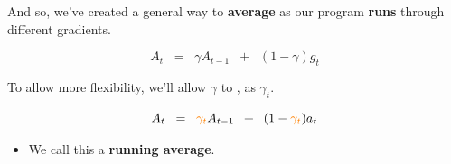             And so, we've created a general way to \textbf{average} as our program \textbf{runs} through different gradients.

            \begin{equation}
                A_t \;\;=\;\; 
                \gamma A_{t-1} \;\;+\;\; 
                (1-\gamma) g_t
            \end{equation}

            To allow more flexibility, we'll allow $\gamma$ to , as $\gamma_t$.
            
            \begin{equation}
                A_t \;\;=\;\; 
                \textcolor{orange}{\gamma_t} A_{t-1} \;\;+\;\; 
                (1-\textcolor{orange}{\gamma_t}) a_t
            \end{equation}

            \begin{itemize}
                \item We call this a \textbf{running average}.\\
            \end{itemize}

